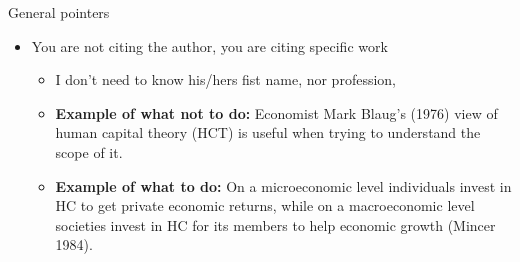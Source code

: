 \documentclass{beamer}
\begin{document}
\begin{frame}{General pointers}

\begin{itemize}
	\item You are not citing the author, you are citing specific work
\begin{itemize}

	\item I don't need to know his/hers fist name, nor profession,

	\item \textbf{Example of what not to do:} Economist Mark Blaug's (1976)
		view of human capital theory (HCT) is useful when trying to
		understand the scope of it. 
	
	\item \textbf{Example of what to do:} On a microeconomic level
		individuals invest in HC to get private economic returns, while
		on a macroeconomic level societies invest in HC for its members
		to help economic growth (Mincer 1984). 

\end{itemize}
\end{itemize}	

\end{frame}
\end{document}
